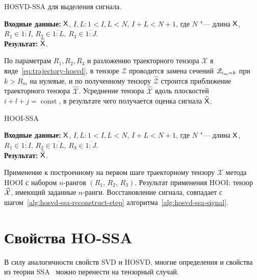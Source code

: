 \documentclass[specialist,
    substylefile = spbu.rtx,
    subf,href,colorlinks=true, 12pt]{disser}
\theoremstyle{plain}
\theoremstyle{definition}
\theoremstyle{remark}
\newcommand{\Input}{\textbf{Входные данные: }}
\newcommand{\Output}{\textbf{Результат: }}
\begin{document}
    \begin{algorithm}[!ht]
        \caption{HOSVD-SSA для выделения сигнала.}
        \label{alg:hosvd-ssa-signal}
        \Input $\mathsf{X}$, $I,L: 1< I,L < N,\, I + L < N + 1$, где $N$ "--- длина $\mathsf{X}$, $R_1 \in \overline{1:I}$,
        $R_2 \in \overline{1:L}$, $R_3 \in \overline{1:J}$.\\
        \Output $\widehat{\mathsf{X}}$.

        \begin{algorithmic}[1]
            \State По параметрам $R_1, R_2, R_3$ и разложению траекторного тензора $\mathcal{X}$
            в виде~\eqref{eq:trajectory-hosvd},
            в тензоре $\mathcal{Z}$ проводится замена сечений $\mathcal{Z}_{i_m = k}$ при $k>R_m$ на нулевые,
            и по полученному тензору $\widehat{\mathcal{Z}}$
            строится приближение траекторного тензора $\widehat{\mathcal{X}}$.
            \State \label{alg:hosvd-ssa-reconstruct-step}
            Усреднение тензора $\widehat{\mathcal{X}}$ вдоль плоскостей $i+l+j=\operatorname{const}$,
            в результате чего получается оценка сигнала $\widehat{\mathsf{X}}$.
        \end{algorithmic}
    \end{algorithm}

    \begin{algorithm}[!ht]
        \caption{HOOI-SSA}
        \label{alg:hooi-ssa}
        \Input $\mathsf{X}$, $I,L: 1< I,L <N,\, I + L < N + 1$, где $N$ "--- длина $\mathsf{X}$, $R_1 \in \overline{1:I}$,
        $R_2 \in \overline{1:L}$, $R_3 \in \overline{1:J}$.\\
        \Output $\widehat{\mathsf{X}}$.

        \begin{algorithmic}[1]
            \State Применение к построенному на первом шаге траекторному тензору $\mathcal{X}$ метода
            HOOI с набором $n$-рангов $(R_1,\, R_2,\, R_3)$. Результат применения HOOI: тензор $\widehat{\mathcal{X}}$,
            имеющий заданные $n$-ранги.
            \State Восстановление сигнала, совпадает с шагом~\ref{alg:hosvd-ssa-reconstruct-step}
            алгоритма~\ref{alg:hosvd-ssa-signal}.
        \end{algorithmic}
    \end{algorithm}


    \section{Свойства HO-SSA}\label{sec:HO-SSA-properties}
    В силу аналогичности свойств SVD и HOSVD, многие определения и свойства из теории SSA~\cite{ssa} можно перенести на тензорный случай.
\end{document}
